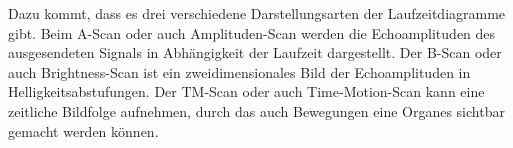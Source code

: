 Dazu kommt, dass es drei verschiedene Darstellungsarten der Laufzeitdiagramme gibt.
Beim A-Scan oder auch Amplituden-Scan werden die Echoamplituden des ausgesendeten Signals in Abhängigkeit der Laufzeit dargestellt.
Der B-Scan oder auch Brightness-Scan ist ein zweidimensionales Bild der Echoamplituden in Helligkeitsabstufungen.
Der TM-Scan oder auch Time-Motion-Scan kann eine zeitliche Bildfolge aufnehmen, durch das auch Bewegungen eine Organes sichtbar gemacht werden können.
